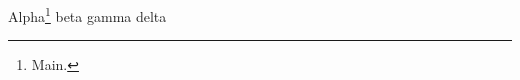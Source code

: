 \documentclass{article}
\begin{document}
Alpha\footnote{Main.} beta\footnotemarkB{} gamma delta
\end{document}
